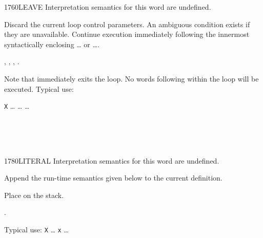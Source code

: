 \begin{worddef}{1760}{LEAVE}
\interpret
	Interpretation semantics for this word are undefined.

\execute
	\stack{}{}

	Discard the current loop control parameters. An ambiguous condition
	exists if they are unavailable. Continue execution immediately
	following the innermost syntactically enclosing
	\ldots{} or \ldots{}.

\see {},
	,
	,
	.

	\begin{rationale} %
		Note that  immediately exits the loop. No words
		following  within the loop will be executed.
		Typical use:

		\tab \word{:} \texttt{X} {\ldots} 
			{\ldots} 
				{\ldots} 
			 
		\word{;}
	\end{rationale}

	\begin{testing} %
		 \\
		 \\
		 \\
	\end{testing}
\end{worddef}


\begin{worddef}{1780}{LITERAL}
\interpret
	Interpretation semantics for this word are undefined.

\compile

	Append the run-time semantics given below to the current definition.

\runtime

	Place  on the stack.

\see {}.

	\begin{rationale} %
		Typical use:
			\word{:} \texttt{X} {\ldots}
				\word{[} \texttt{x} \word{]} 
			{\ldots} \word{;}
	\end{rationale}

	\begin{testing} %
		 \\
	\end{testing}
\end{worddef}


